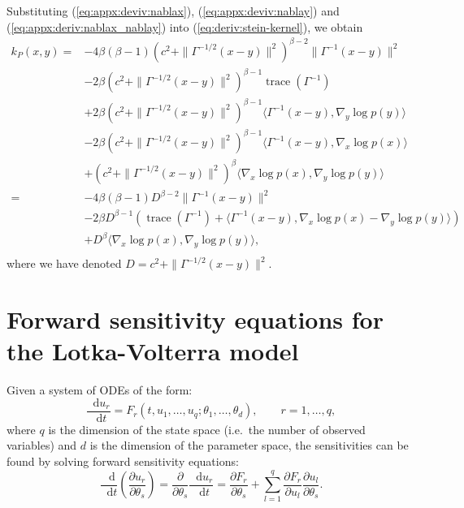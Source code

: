\documentclass[11pt,a4paper]{report}
\newcommand*\diff{\mathop{}\!\mathrm{d}}
\DeclareMathOperator{\trace}{trace}
\begin{document}
Substituting (\ref{eq:appx:deviv:nablax}), (\ref{eq:appx:deviv:nablay}) and (\ref{eq:appx:deriv:nablax_nablay}) into (\ref{eq:deriv:stein-kernel}), we obtain
\begin{equation}
\begin{aligned}
k_P(x, y)
= &-4 \beta(\beta-1) \left(c^2 + \| \Gamma^{-1/2}(x-y)\|^2\right)^{\beta-2} \| \Gamma^{-1}(x - y)\|^2 \\
&- 2\beta \left(c^2 + \|\Gamma^{-1/2}(x-y)\|^2\right)^{\beta-1} \trace(\Gamma^{-1}) \\
&+ 2 \beta \left(c^2 + \| \Gamma^{-1/2} (x-y)\|^2\right)^{\beta-1} \langle \Gamma^{-1} (x - y), \nabla_y \log p(y)\rangle \\
&- 2 \beta \left(c^2 + \| \Gamma^{-1/2} (x-y)\|^2\right)^{\beta-1} \langle \Gamma^{-1} (x - y), \nabla_x \log p(x)\rangle \\
&+ \left(c^2 + \| \Gamma^{-1/2} (x-y)\|^2\right)^\beta \langle \nabla_x \log p(x), \nabla_y \log p(y) \rangle \\
= &-4 \beta(\beta-1) D^{\beta-2} \| \Gamma^{-1}(x - y)\|^2  \\
&- 2 \beta D^{\beta-1} (\trace(\Gamma^{-1}) + \langle \Gamma^{-1} (x - y), \nabla_x \log p(x) - \nabla_y \log p(y)\rangle) \\
&+ D^\beta \langle \nabla_x \log p(x), \nabla_y \log p(y) \rangle, \\
\end{aligned}
\label{eq:k_P:IMQ}
\end{equation}
where we have denoted $D = c^2 + \| \Gamma^{-1/2}(x-y)\|^2$.

\section{Forward sensitivity equations for the Lotka-Volterra model}
\label{appendix:derivations:forward-sensitivity}

Given a system of ODEs of the form:
$$\frac{\diff u_r}{\diff t} = F_r(t, u_1, \dots, u_q; \theta_1, \dots, \theta_d),\qquad r=1,\dots,q,$$
where $q$ is the dimension of the state space (i.e.\ the number of observed variables) and $d$ is the dimension of the parameter space,
the sensitivities can be found by solving forward sensitivity equations:
$$\frac{\diff}{\diff t}\left(\frac{\partial u_r}{\partial \theta_s}\right)
= \frac{\partial}{\partial \theta_s}\frac{\diff u_r}{\diff t} 
= \frac{\partial F_r}{\partial \theta_s} + \sum_{l=1}^q \frac{\partial F_r}{\partial u_l} \frac{\partial u_l}{\partial \theta_s}.$$
\end{document}
